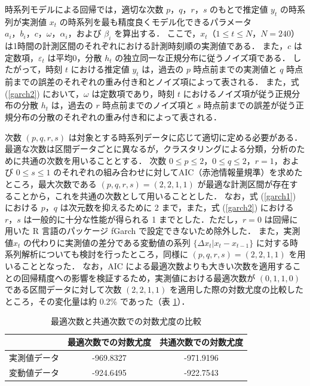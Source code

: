 \documentclass[technicalreport]{ieicej}
\begin{document}
時系列モデルによる回帰では，適切な次数 $p，q，r，s$ のもとで推定値 $y_t$ の時系列が実測値 $x_t$ の時系列を最も精度良くモデル化できるパラメータ $a_i，b_i，c，\omega，\alpha_i，$および $\beta_i$ を算出する．
ここで，$x_t（1\leq t\leq N，N=240）$は1時間の計測区間のそれぞれにおける計測時刻順の実測値である．
また，$c$ は定数項，$\varepsilon_t$ は平均0，分散 $h_t$ の独立同一な正規分布に従うノイズ項である．
したがって，時刻 $t$ における推定値 $y_t$ は，過去の $p$ 時点前までの実測値と $q$ 時点前までの誤差のそれぞれの重み付き和とノイズ項によって表される．
また，式 (\ref{garch2}) において，$\omega$ は定数項であり，時刻 $t$ におけるノイズ項が従う正規分布の分散 $h_t$ は，過去の $r$ 時点前までのノイズ項と $s$ 時点前までの誤差が従う正規分布の分散のそれぞれの重み付き和によって表される．

次数 $(p,q,r,s)$ は対象とする時系列データに応じて適切に定める必要がある．
最適な次数は区間データごとに異なるが，クラスタリングによる分類，分析のために共通の次数を用いることとする．
次数 $0\leq p\leq2，0\leq q\leq 2，r=1$，および $0\leq s\leq 1$ のそれぞれの組み合わせに対してAIC（赤池情報量規準）\cite{aic1}\cite{aic2}を求めたところ，最大次数である $(p,q,r,s)=(2,2,1,1)$ が最適な計測区間が存在することから，これを共通の次数として用いることとした．
なお，式 (\ref{garch1}) における $p，q$ は次元数を抑えるために 2 まで，また，式 (\ref{garch2}) における $r，s$ は一般的に十分な性能が得られる 1 までとした\cite{hansen2005forecast}．ただし，$r=0$ は回帰に用いた R 言語のパッケージ fGarch で設定できないため除外した．
また，実測値$ x_t$ の代わりに実測値の差分である変動値の系列 $\{\Delta x_t | x_t - x_{t-1} \}$ に対する時系列解析についても検討を行ったところ，同様に $(p,q,r,s)=(2,2,1,1)$ を用いることとなった．
なお，AIC による最適次数よりも大きい次数を適用することの回帰精度への影響を検証するため，実測値における最適次数が $(0,1,1,0) $である区間データに対して次数 $(2,2,1,1)$ を適用した際の対数尤度の比較したところ，その変化量は約 0.2\% であった（表 \ref{more-param}）．

\begin{table}[tb]
\centering
\caption{最適次数と共通次数での対数尤度の比較}
\label{more-param}
\begin{tabular}{|l|c|c|}
\hline
&最適次数での対数尤度&共通次数での対数尤度\\
\hline
実測値データ&-969.8327&-971.9196\\
\hline
変動値データ&-924.6495&-922.7543\\
\hline
\end{tabular}
\end{table}
\end{document}
